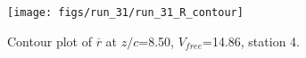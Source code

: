 \begin{figure}[H]
\centering
\texttt{[image: figs/run\_31/run\_31\_R\_contour]}
\caption{Contour plot of $\overline{r}$ at $z/c$=8.50, $V_{free}$=14.86, station 4.}
\label{fig:run_31_R_contour}
\end{figure}


